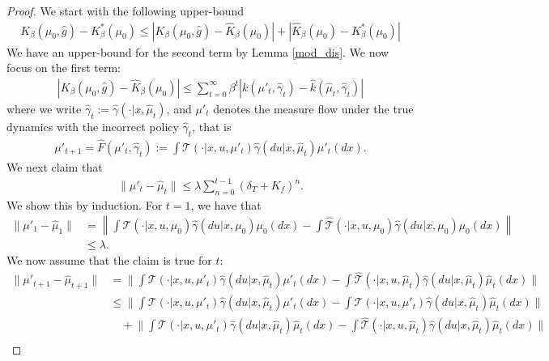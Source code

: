 \documentclass[10pt,a4paper]{amsart}
\begin{document}
\begin{proof}
We start with the following upper-bound
\begin{align}\label{init_bound}
K_\beta(\mu_0,\hat{g}) - K_\beta^*(\mu_0)\leq \left| K_\beta(\mu_0,\hat{g})  - \hat{K}_\beta(\mu_0)\right| + \left|\hat{K}_\beta(\mu_0) -  K_\beta^*(\mu_0)\right|
\end{align}
We have an upper-bound for the second term by Lemma \ref{mod_dis}. We now focus on the first term:
\begin{align*}
 \left| K_\beta(\mu_0,\hat{g})  - \hat{K}_\beta(\mu_0)\right| \leq \sum_{t=0}^\infty \beta^t \left| k(\mu'_t,\hat{\gamma}_t) - \hat{k}(\hat{\mu}_t,\hat{\gamma}_t) \right|
\end{align*}
where we write $\hat{\gamma}_t:=\hat{\gamma}(\cdot|x,\hat{\mu}_t)$, and $\mu'_t$ denotes the measure flow under the true dynamics with the incorrect policy $\hat{\gamma}_t$, that is 
\begin{align*}
\mu'_{t+1} = \hat{F}(\mu'_t,\hat{\gamma}_t) := \int {\mathcal{T}}(\cdot|x,u,\mu'_t) \hat{\gamma}(du|x,\hat{\mu}_t) \mu'_t(dx).
\end{align*}
We next claim that
\begin{align*}
\|\mu'_{t} - \hat{\mu}_t\| \leq \lambda \sum_{n=0}^{t-1} (\delta_T + K_f)^n.
\end{align*}
We show this by induction. For $t=1$, we have that
\begin{align*}
\|\mu'_{1} - \hat{\mu}_1\| &= \left\|\int  {\mathcal{T}}(\cdot|x,u,\mu_0) \hat{\gamma}(du|x, {\mu}_0) \mu_0(dx) -  \int \hat{\mathcal{T}}(\cdot|x,u,\mu_0) \hat{\gamma}(du|x,{\mu}_0) \mu_0(dx)\right\|\\
&\leq \lambda.
\end{align*}
We now assume that the claim is true for $t$:
\begin{align*}
\|\mu'_{t+1} - \hat{\mu}_{t+1}\| &= \bigg\|  \int {\mathcal{T}}(\cdot|x,u,\mu'_t) \hat{\gamma}(du|x,\hat{\mu}_t) \mu'_t(dx) -  \int \hat{\mathcal{T}}(\cdot|x,u,\hat{\mu}_t) \hat{\gamma}(du|x,\hat{\mu}_t) \hat{\mu}_t(dx)\bigg\|\\
&\leq \bigg\|  \int {\mathcal{T}}(\cdot|x,u,\mu'_t) \hat{\gamma}(du|x,\hat{\mu}_t) \mu'_t(dx) -  \int {\mathcal{T}}(\cdot|x,u,{\mu}'_t) \hat{\gamma}(du|x,\hat{\mu}_t) \hat{\mu}_t(dx)\bigg\|\\
& \quad + \bigg\|  \int {\mathcal{T}}(\cdot|x,u,\mu'_t) \hat{\gamma}(du|x,\hat{\mu}_t) \hat{\mu}_t(dx) -  \int \hat{\mathcal{T}}(\cdot|x,u,\hat{\mu}_t) \hat{\gamma}(du|x,\hat{\mu}_t) \hat{\mu}_t(dx)\bigg\|\\

\end{align*}
\end{proof}
\end{document}
